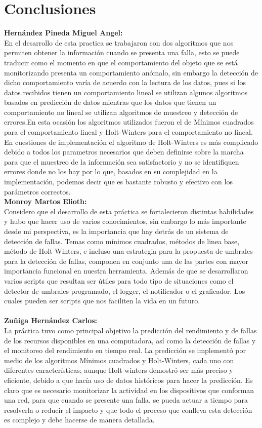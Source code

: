\chapter{Conclusiones}
\noindent
\textbf{Hernández Pineda Miguel Angel:}\\
En el desarrollo de esta practica se trabajaron con dos algoritmos que nos permiten obtener la información cuando se presenta una falla, esto se puede traducir como el momento en que el comportamiento del objeto que se está monitorizando presenta un comportamiento anómalo, sin embargo la detección de dicho comportamiento varía de acuerdo con la lectura de los datos, pues si los datos recibidos tienen un comportamiento lineal se utilizan algunos algoritmos basados en predicción de datos mientras que los datos que tienen un comportamiento no lineal se utilizan algoritmos de muestreo y detección de errores.En esta ocasión los algoritmos utilizados fueron el de Mínimos cuadrados para el comportamiento lineal y Holt-Winters para el comportamiento no lineal. En cuestiones de implementación el algoritmo de Holt-Winters es más complicado debido a todos los parametros necesarios que deben definirse sobre la marcha para que el muestreo de la información sea satisfactorio y no se identifiquen errores donde no los hay por lo que, basados en su complejidad en la implementación, podemos decir que es bastante robusto y efectivo con los parámetros correctos.
\noindent
\\
\textbf{Monroy Martos Elioth:}\\
Considero que el desarrollo de esta práctica se fortalecieron distintas habilidades y hubo que hacer uso de varios conocimientos, sin embargo lo más importante desde mi perspectiva, es la importancia que hay detrás de un sistema de detección de fallas. Temas como mínimos cuadrados, métodos de linea base, método de Holt-Winters, e incluso una estrategia para la propuesta de umbrales para la detección de fallas, componen en conjunto una de las partes con mayor importancia funcional en nuestra herramienta. Además de que se desarrollaron varios scripts que resultan ser útiles para todo tipo de situaciones como el detector de umbrales programado, el logger, el notificador o el graficador. Los cuales pueden ser scripts que nos faciliten la vida en un futuro.\\
\noindent
\\
\textbf{Zuñiga Hernández Carlos:}\\
La práctica tuvo como principal objetivo la predicción del rendimiento y de fallas de los recursos disponibles en una computadora, así como la detección de fallas y el monitoreo del rendimiento en tiempo real. La predicción se implementó por medio de los algoritmos Mínimos cuadrados y Holt-Winters, cada uno con diferentes características; aunque Holt-winters demostró ser más preciso y eficiente, debido a que hacía uso de datos históricos para hacer la predicción. Es claro que es necesario monitorizar la actividad en los dispositivos que conforman una red, para que cuando se presente una falla, se pueda actuar a tiempo para resolverla o reducir el impacto y que todo el proceso que conlleva esta detección es complejo y debe hacerse de manera detallada.